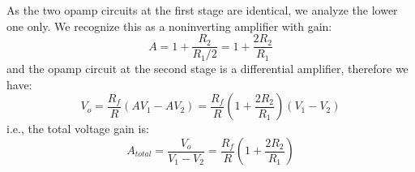 \usepackage{html}




  As the two opamp circuits at the first stage are identical, we analyze the
  lower one only.  We recognize this as a noninverting amplifier with gain:
  \[ A=1+\frac{R_2}{R_1/2}=1+\frac{2R_2}{R_1} \]
  and the opamp circuit at the second stage is a differential amplifier, 
  therefore we have:
  \[ V_o=\frac{R_f}{R}(AV_1-AV_2)=\frac{R_f}{R}(1+\frac{2R_2}{R_1})(V_1-V_2) \]
  i.e., the total voltage gain is:
  \[ A_{total}=\frac{V_o}{V_1-V_2}=\frac{R_f}{R}(1+\frac{2R_2}{R_1}) \]




